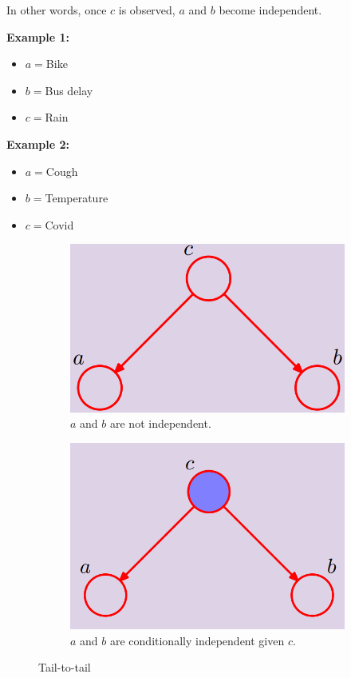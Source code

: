 In other words, once $c$ is observed, $a$ and $b$ become independent. \newline

\textbf{Example 1:}
\begin{itemize}
    \item $a=$Bike
    \item $b=$Bus delay
    \item $c=$Rain
\end{itemize}

\textbf{Example 2:}
\begin{itemize}
    \item $a=$Cough
    \item $b=$Temperature
    \item $c=$Covid
\end{itemize}

\begin{figure}
\centering
\begin{subfigure}[t]{0.49\textwidth}
\centering
\includegraphics[width=\linewidth]{images/tailtToTail1.png} 
\caption{$a$ and $b$ are not independent.}
\label{fig:unSelectedTailToTail}
\end{subfigure}
\hfill
\begin{subfigure}[t]{0.49\textwidth}
\centering
\includegraphics[width=\linewidth]{images/tailtToTailSelected.png}
\caption{$a$ and $b$ are conditionally independent given $c$.}
\label{fig:selectedTailToTail}
\end{subfigure}

\caption{Tail-to-tail}
\label{fig:tail-to-tail}
\end{figure}

